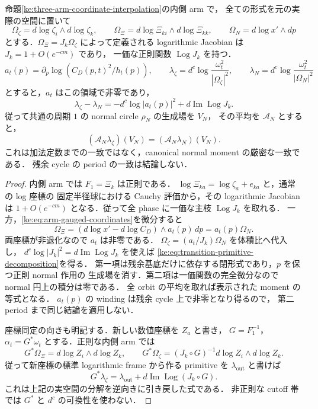 \begin{corollary}
\label{ke:transition-normal-primitive}
命題\ref{ke:three-arm-coordinate-interpolation}の内側 arm で，
全ての形式を元の実際の空間に置いて
\[
 \Omega_\zeta=d\log\zeta_i\wedge d\log\zeta_k,\qquad
 \Omega_\Xi=d\log\Xi_{ki}\wedge d\log\Xi_{kk},\qquad
 \Omega_N=d\log x'\wedge dp
\]
とする．$\Omega_\Xi=J_k\Omega_\zeta$ によって定義される
logarithmic Jacobian は $J_k=1+O(e^{-cm})$ であり，
一価な正則関数 $\operatorname{Log}J_k$ を持つ．
\[
 a_t(p)=\partial_p\log(C_D(p,t)^2/h_t(p)),\qquad
 \lambda_\zeta=d^c\log\frac{\omega_t^2}{|\Omega_\zeta|^2},\qquad
 \lambda_N=d^c\log\frac{\omega_t^2}{|\Omega_N|^2}
\]
とすると，$a_t$ はこの領域で非零であり，
\begin{equation}\label{ke:eq:transition-primitive-decomposition}
 \lambda_\zeta-\lambda_N
 =-d^c\log|a_t(p)|^2+d\operatorname{Im}\operatorname{Log}J_k.
\end{equation}
従って共通の周期 $1$ の normal circle $\rho_N$ の生成場を $V_N$，
その平均を $\mathcal A_N$ とすると，
\[
 (\mathcal A_N\lambda_\zeta)(V_N)
   =(\mathcal A_N\lambda_N)(V_N).
\]
これは加法定数までの一致ではなく，canonical normal moment の厳密な一致である．
残余 cycle の period の一致は結論しない．
\end{corollary}
\begin{proof}
内側 arm では $F_1=\Xi_k$ は正則である．
$\log\Xi_{ka}=\log\zeta_a+e_{ka}$ と，通常の log 座標の
固定半径球における Cauchy 評価から，その logarithmic Jacobian は
$1+O(e^{-cm})$ となる．従って全 phase に一価な主枝 $\operatorname{Log}J_k$ を取れる．
一方，\eqref{ke:eq:arm-gauged-coordinates}を微分すると
\[
 \Omega_\Xi
 =(d\log x'-d\log C_D)\wedge a_t(p)\,dp
 =a_t(p)\Omega_N.
\]
両座標が非退化なので $a_t$ は非零である．
$\Omega_\zeta=(a_t/J_k)\Omega_N$ を体積比へ代入し，
$d^c\log|J_k|^2=d\operatorname{Im}\operatorname{Log}J_k$ を使えば
\eqref{ke:eq:transition-primitive-decomposition}を得る．
第一項は残余基底だけに依存する閉形式であり，$p$ を保つ正則 normal 作用の
生成場を消す．第二項は一価関数の完全微分なので normal 円上の積分は零である．
全 orbit の平均を取れば表示された moment の等式となる．
$a_t(p)$ の winding は残余 cycle 上で非零となり得るので，
第二 period まで同じ結論を適用しない．

座標同定の向きも明記する．新しい数値座標を $Z_a$ と書き，
$G=F_1^{-1}$，$\alpha_t=G^*\omega_t$ とする．正則な内側 arm では
\[
 G^*\Omega_\Xi=d\log Z_i\wedge d\log Z_k,\qquad
 G^*\Omega_\zeta=(J_k\circ G)^{-1}d\log Z_i\wedge d\log Z_k.
\]
従って新座標の標準 logarithmic frame から作る primitive を
$\lambda_{\mathrm{out}}$
と書けば
\[
 G^*\lambda_\zeta
 =\lambda_{\mathrm{out}}
       +d\operatorname{Im}\operatorname{Log}(J_k\circ G).
\]
これは上記の実空間の分解を逆向きに引き戻した式である．
非正則な cutoff 帯では $G^*$ と $d^c$ の可換性を使わない．
\end{proof}


